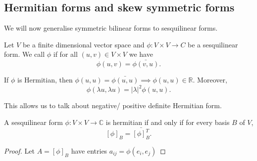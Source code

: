 \documentclass[a4paper]{scrartcl}
\begin{document}
\subsection{Hermitian forms and skew symmetric forms}
We will now generalise symmetric bilinear forms to sesquilinear forms.
\begin{definition}
     Let $V$ be a finite dimensional vector space and $\phi: V \times V \rightarrow C$ be a sesquilinear form. We call $\phi$  if for all $(u,v) \in V \times V$ we have 
     \[\phi (u,v)=\bar{\phi (v,u)}.\]
\end{definition}
\begin{remark}
     If $\phi$ is Hermitian, then $\phi (u,u)=\bar{\phi (u,u)} \implies \phi (u,u) \in \mathbb{R}$. Moreover, 
     \[\phi (\lambda u , \lambda u)= |\lambda|^2 \phi (u,u).\]
\end{remark}
This allows us to talk about negative/ positive definite Hermitian form.

\begin{lemma}
     A sesquilinear form $\phi: V \times V \rightarrow \mathbb{C}$ is hermitian if and only if for every basis $B$ of $V$, 
     \[[\phi]_B=\bar{[\phi]_B^T}.\]
     
\end{lemma}
\begin{proof}
     Let $A=[\phi]_B$ have entries $a_{ij}=\phi(e_i,e_j)$
\end{proof}
\end{document}

